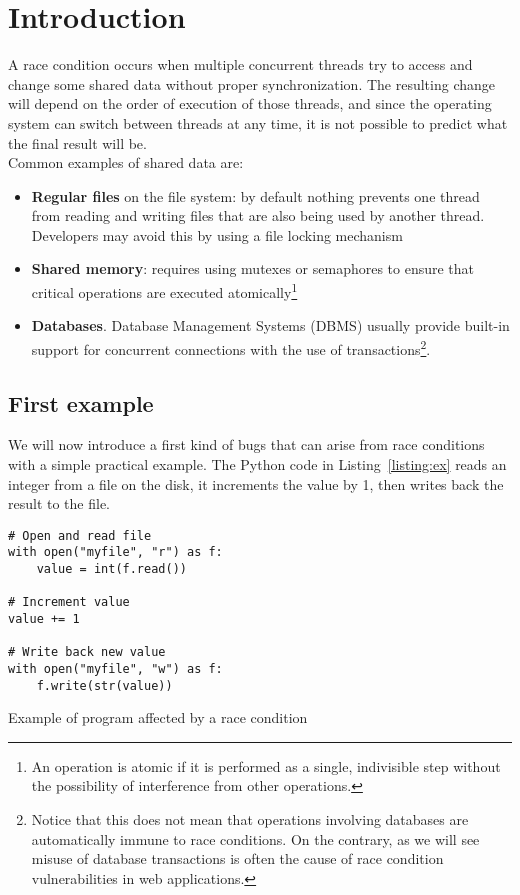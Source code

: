 \section{Introduction}

A race condition occurs when multiple concurrent threads try to access and change some shared data without proper synchronization. The resulting change will depend on the order of execution of those threads, and since the operating system can switch between threads at any time, it is not possible to predict what the final result will be.\\

Common examples of shared data are:
\begin{itemize}
  \item \textbf{Regular files} on the file system: by default nothing prevents one thread from reading and writing files that are also being used by another thread. Developers may avoid this by using a file locking mechanism
  \item \textbf{Shared memory}: requires using mutexes or semaphores to ensure that critical operations are executed atomically\footnote{An operation is atomic if it is performed as a single, indivisible step without the possibility of interference from other operations.}
  \item \textbf{Databases}. Database Management Systems (DBMS) usually provide built-in support for concurrent connections with the use of transactions\footnote{Notice that this does not mean that operations involving databases are automatically immune to race conditions. On the contrary, as we will see misuse of database transactions is often the cause of race condition vulnerabilities in web applications.}.
\end{itemize}

\subsection{First example}

We will now introduce a first kind of bugs that can arise from race conditions with a simple practical example. The Python code in Listing~\ref{listing:ex} reads an integer from a file on the disk, it increments the value by 1, then writes back the result to the file.

\begin{listing}[H]
\begin{verbatim}
# Open and read file
with open("myfile", "r") as f:
    value = int(f.read())

# Increment value
value += 1

# Write back new value
with open("myfile", "w") as f:
    f.write(str(value))
\end{verbatim}
\caption{Example of program affected by a race condition}
\label{listing:ex}
\end{listing}

